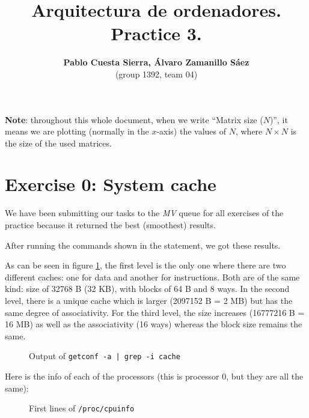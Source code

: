 \documentclass{article}
\begin{document}
\title{\textbf{Arquitectura de ordenadores. Practice 3.}}
\author{\textbf{Pablo Cuesta Sierra, Álvaro Zamanillo Sáez}\\(group 1392, team 04)}
\maketitle

\begin{tcolorbox}
\tableofcontents
\end{tcolorbox}

\bigskip

\textbf{Note}: throughout this whole document, when we write ``Matrix size ($N$)'', it means we are plotting (normally in the $x$-axis) the values of $N$, where $N\times N$ is the size of the used matrices.

\pagebreak

\section*{Exercise 0: System cache}

We have been submitting our tasks to the \emph{MV} queue for all exercises of the practice because it returned the best (smoothest) results. 

After running the commands shown in the statement, we got these results. 

As can be seen in figure \ref{cache_conf}, the first level is the only one where there are two different caches: one for data and another for instructions. Both are of the same kind: size of 32768 B (32 KB), with blocks of 64 B and 8 ways. 
In the second level, there is a unique cache which is larger (2097152 B = 2 MB) but has the same degree of associativity. For the third level, the size increases (16777216 B = 16 MB) as well as the associativity (16 ways) whereas the block size remains the same.

\begin{figure}[h]
    
    \centering
    \caption{Output of \texttt{getconf -a | grep -i cache}}
    \label{cache_conf}
\end{figure}

Here is the info of each of the processors (this is processor 0, but they are all the same):

\begin{figure}[h]
    
    \centering
    \caption{First lines of \texttt{/proc/cpuinfo}}
    \label{cpuinfo}
\end{figure}
\end{document}
